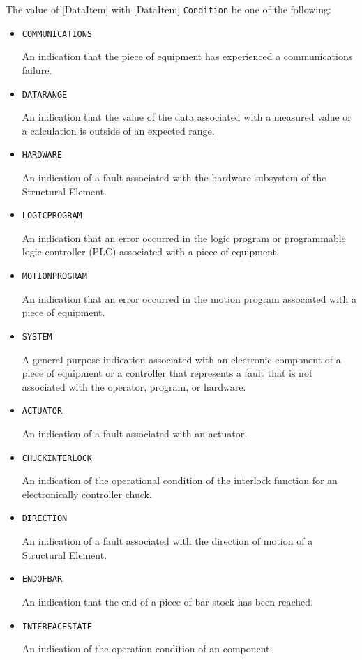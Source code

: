 The value of [DataItem] with [DataItem] \texttt{Condition} \MUST be one of the following:
\begin{itemize}


\item \texttt{COMMUNICATIONS}  

An indication that the piece of equipment has experienced a communications failure.


\item \texttt{DATA\textunderscore RANGE}  

An indication that the value of the data associated with a measured value or a calculation is outside of an expected range.


\item \texttt{HARDWARE}  

An indication of a fault associated with the hardware subsystem of the \gls{Structural Element}.


\item \texttt{LOGIC\textunderscore PROGRAM}  

An indication that an error occurred in the logic program or programmable logic controller (PLC) associated with a piece of equipment.


\item \texttt{MOTION\textunderscore PROGRAM}  

An indication that an error occurred in the motion program associated with a piece of equipment.


\item \texttt{SYSTEM}  

A general purpose indication associated with an electronic component of a piece of equipment or a controller that represents a fault that is not associated with the operator, program, or hardware.


\item \texttt{ACTUATOR}  

An indication of a fault associated with an actuator.


\item \texttt{CHUCK\textunderscore INTERLOCK}  

An indication of the operational condition of the interlock function for an electronically controller chuck.


\item \texttt{DIRECTION}  

An indication of a fault associated with the direction of motion of a \gls{Structural Element}.


\item \texttt{END\textunderscore OF\textunderscore BAR}  

An indication that the end of a piece of bar stock has been reached.


\item \texttt{INTERFACE\textunderscore STATE}  

An indication of the operation condition of an  component.

\end{itemize}



